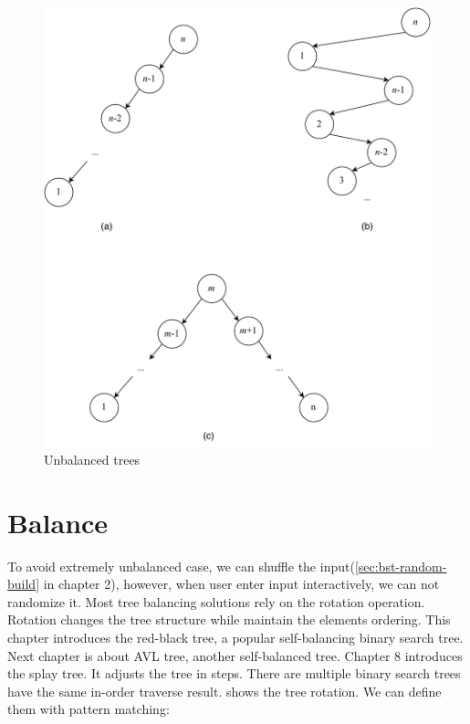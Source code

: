 \documentclass[b5paper]{article}
\begin{document}
\begin{figure}[htbp]
  \centering
  \includegraphics[scale=0.5]{img/unbalanced-trees}
  \caption{Unbalanced trees}
  \label{fig:unbalanced-trees}
\end{figure}

\section{Balance}

To avoid extremely unbalanced case, we can shuffle the input(\cref{sec:bst-random-build} in chapter 2), however, when user enter input interactively, we can not randomize it. Most tree balancing solutions rely on the rotation operation. Rotation changes the tree structure while maintain the elements ordering. This chapter introduces the red-black tree, a popular self-balancing binary search tree. Next chapter is about AVL tree, another self-balanced tree. Chapter 8 introduces the splay tree. It adjusts the tree in steps. There are multiple binary search trees have the same in-order traverse result.  shows the tree rotation. We can define them with pattern matching:
\end{document}
